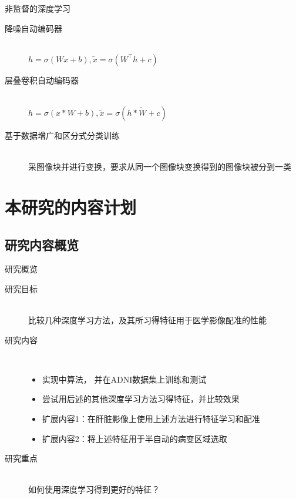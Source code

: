 \documentclass {beamer}
\newcommand{\trans}[1]{#1^\intercal}
\begin{document}
\begin{frame}{非监督的深度学习}
    \begin{description}
        \item[降噪自动编码器\cite{vincent2010stacked}]
            \hfill \\
            $h=\sigma(Wx+b), \tilde{x}=\sigma(\trans{W}h+c)$
        \item[层叠卷积自动编码器\cite{masci2011stacked}]
            \hfill \\
            $h=\sigma(x*W+b), \tilde{x}=\sigma(h*\tilde{W}+c)$
        \item[基于数据增广和区分式分类训练\cite{dosovitskiy2014discriminative}]
            \hfill \\
            采图像块并进行变换，要求从同一个图像块变换得到的图像块被分到一类
    \end{description}
\end{frame}


\section{本研究的内容计划}

\subsection{研究内容概览}

\begin{frame}{研究概览}
    \begin{description}
        \item[研究目标] \hfill \\
            比较几种深度学习方法，及其所习得特征用于医学影像配准的性能
        \item[研究内容] \hfill \\
            \begin{itemize}
                \item 实现\cite{wu2013unsupervised}中算法，
                    并在ADNI数据集上训练和测试
                \item 尝试用后述的其他深度学习方法习得特征，并比较效果
                \item 扩展内容1：在肝脏影像上使用上述方法进行特征学习和配准
                \item 扩展内容2：将上述特征用于半自动的病变区域选取
            \end{itemize}
        \item[研究重点] \hfill \\
            如何使用深度学习得到更好的特征？
    \end{description}
\end{frame}
\end{document}
